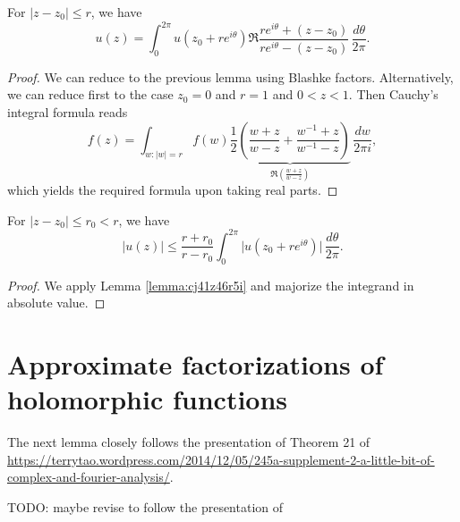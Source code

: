 \documentclass[reqno]{amsart} 
\begin{document}
\begin{lemma}\label{lemma:cj41z46r5i}
  For $\lvert z - z_0 \rvert \leq r$, we have
  \begin{equation*}
    u(z) = \int_0^{2 \pi } u (z_0 + r e^{i \theta }) \Re \frac{r e^{i \theta } + (z - z_0 )}{r e^{i \theta } - (z - z_0 )}
    \, \frac{d \theta }{2 \pi }.
  \end{equation*}
\end{lemma}
\begin{proof}
  We can reduce to the previous lemma using Blashke factors.  Alternatively, we can reduce first to the case $z_0 = 0$ and $r = 1$ and $0 < z < 1$.  Then Cauchy's integral formula reads
  \begin{equation*}
    f(z) =
    \int_{w : \lvert w \rvert = r}
    f(w)
    \underbrace
{
\frac{1}{2} \left(
      \frac{w + z}{w - z}
      + 
      \frac{w^{-1}  + z}{w^{-1}  - z}
    \right)
}_{
\Re \left( \frac{w + z}{w - z} \right)
}
\, \frac{d w}{2 \pi i},
  \end{equation*}
  which yields the required formula upon taking real parts.
\end{proof}

\begin{lemma}\label{lemma:cj41z46zau}
  For $\lvert z - z_0 \rvert \leq r_0 < r$, we have
  \begin{equation*}
    \lvert u(z) \rvert \leq \frac{r + r_0}{r - r_0}
\int_{0 }^{2 \pi } \lvert u (z_0 + r e^{i \theta }) \rvert \, \frac{d \theta }{2 \pi}.    
  \end{equation*}
\end{lemma}
\begin{proof}
We apply Lemma \ref{lemma:cj41z46r5i} and majorize the integrand in absolute value.
\end{proof}

\section{Approximate factorizations of holomorphic functions}\label{sec:cj41z5fwla}
The next lemma closely follows the presentation of Theorem 21 of \href{these notes}{https://terrytao.wordpress.com/2014/12/05/245a-supplement-2-a-little-bit-of-complex-and-fourier-analysis/}.

TODO: maybe revise to follow the presentation of \cite[\S3.9]{MR882550}
\end{document}
